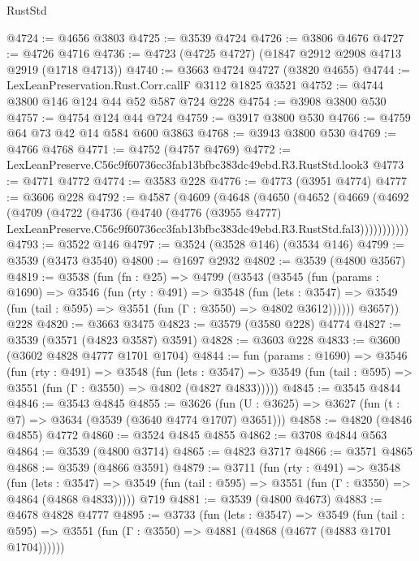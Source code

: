 \begin{lexlean}{RustStd}
\begin{coremodule}
@4724 := @4656 @3803
@4725 := @3539 @4724
@4726 := @3806 @4676
@4727 := @4726 @4716
@4736 := @4723 (@4725 @4727) (@1847 @2912 @2908 @4713 @2919 (@1718 @4713))
@4740 := @3663 @4724 @4727 (@3820 @4655)
@4744 := LexLeanPreservation.Rust.Corr.callF @3112 @1825 @3521
@4752 := @4744 @3800 @146 @124 @44 @52 @587 @724 @228
@4754 := @3908 @3800 @530
@4757 := @4754 @124 @44 @724
@4759 := @3917 @3800 @530
@4766 := @4759 @64 @73 @42 @14 @584 @600 @3863
@4768 := @3943 @3800 @530
@4769 := @4766 @4768
@4771 := @4752 (@4757 @4769)
@4772 := LexLeanPreserve.C56c9f60736cc3fab13bfbc383dc49ebd.R3.RustStd.look3
@4773 := @4771 @4772
@4774 := @3583 @228
@4776 := @4773 (@3951 @4774)
@4777 := @3606 @228
@4792 := @4587
    (@4609
      (@4648
        (@4650
          (@4652
            (@4669
              (@4692
                (@4709
                  (@4722
                    (@4736
                      (@4740
                        (@4776
                          (@3955 @4777)
                          LexLeanPreserve.C56c9f60736cc3fab13bfbc383dc49ebd.R3.RustStd.fal3)))))))))))
@4793 := @3522 @146
@4797 := @3524 (@3528 @146) (@3534 @146)
@4799 := @3539 (@3473 @3540)
@4800 := @1697 @2932
@4802 := @3539 (@4800 @3567)
@4819 := @3538
    (fun (fn : @25) =>
    @4799
      (@3543
        (@3545
          (fun (params : @1690) =>
          @3546
            (fun (rty : @491) =>
            @3548
              (fun (lets : @3547) =>
              @3549 (fun (tail : @595) => @3551 (fun (Γ : @3550) => @4802 @3612))))))
        @3657))
    @228
@4820 := @3663 @3475
@4823 := @3579 (@3580 @228) @4774
@4827 := @3539 (@3571 (@4823 @3587) @3591)
@4828 := @3603 @228
@4833 := @3600 (@3602 @4828 @4777 @1701 @1704)
@4844 := fun (params : @1690) =>
  @3546
    (fun (rty : @491) =>
    @3548
      (fun (lets : @3547) =>
      @3549 (fun (tail : @595) => @3551 (fun (Γ : @3550) => @4802 (@4827 @4833)))))
@4845 := @3545 @4844
@4846 := @3543 @4845
@4855 := @3626 (fun (U : @3625) => @3627 (fun (t : @7) => @3634 (@3539 (@3640 @4774 @1707) @3651)))
@4858 := @4820 (@4846 @4855) @4772
@4860 := @3524 @4845 @4855
@4862 := @3708 @4844 @563
@4864 := @3539 (@4800 @3714)
@4865 := @4823 @3717
@4866 := @3571 @4865
@4868 := @3539 (@4866 @3591)
@4879 := @3711
    (fun (rty : @491) =>
    @3548
      (fun (lets : @3547) =>
      @3549 (fun (tail : @595) => @3551 (fun (Γ : @3550) => @4864 (@4868 @4833)))))
    @719
@4881 := @3539 (@4800 @4673)
@4883 := @4678 @4828 @4777
@4895 := @3733
    (fun (lets : @3547) =>
    @3549
      (fun (tail : @595) => @3551 (fun (Γ : @3550) => @4881 (@4868 (@4677 (@4883 @1701 @1704))))))

\end{coremodule}
\end{lexlean}
